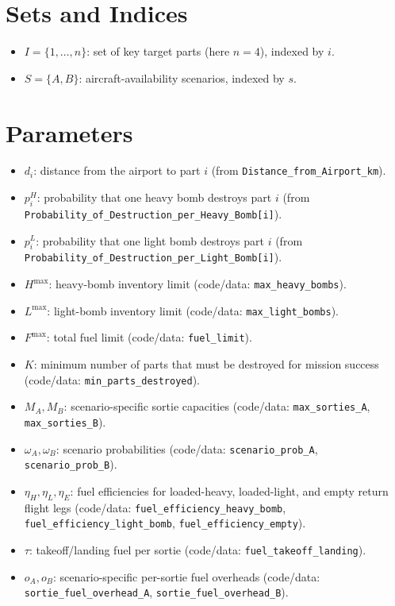\section*{Sets and Indices}

\begin{itemize}
    \item $I=\{1,\dots,n\}$: set of key target parts (here $n=4$), indexed by $i$.
    \item $S=\{A,B\}$: aircraft-availability scenarios, indexed by $s$.
\end{itemize}

\section*{Parameters}

\begin{itemize}
    \item $d_i$: distance from the airport to part $i$ (from \texttt{Distance\_from\_Airport\_km}).
    \item $p_i^H$: probability that one heavy bomb destroys part $i$ (from \texttt{Probability\_of\_Destruction\_per\_Heavy\_Bomb[i]}).
    \item $p_i^L$: probability that one light bomb destroys part $i$ (from \texttt{Probability\_of\_Destruction\_per\_Light\_Bomb[i]}).
    \item $H^{\max}$: heavy-bomb inventory limit (code/data: \texttt{max\_heavy\_bombs}).
    \item $L^{\max}$: light-bomb inventory limit (code/data: \texttt{max\_light\_bombs}).
    \item $F^{\max}$: total fuel limit (code/data: \texttt{fuel\_limit}).
    \item $K$: minimum number of parts that must be destroyed for mission success (code/data: \texttt{min\_parts\_destroyed}).
    \item $M_A, M_B$: scenario-specific sortie capacities (code/data: \texttt{max\_sorties\_A}, \texttt{max\_sorties\_B}).
    \item $\omega_A, \omega_B$: scenario probabilities (code/data: \texttt{scenario\_prob\_A}, \texttt{scenario\_prob\_B}).
    \item $\eta_H,\eta_L,\eta_E$: fuel efficiencies for loaded-heavy, loaded-light, and empty return flight legs (code/data: \texttt{fuel\_efficiency\_heavy\_bomb}, \texttt{fuel\_efficiency\_light\_bomb}, \texttt{fuel\_efficiency\_empty}).
    \item $\tau$: takeoff/landing fuel per sortie (code/data: \texttt{fuel\_takeoff\_landing}).
    \item $o_A,o_B$: scenario-specific per-sortie fuel overheads (code/data: \texttt{sortie\_fuel\_overhead\_A}, \texttt{sortie\_fuel\_overhead\_B}).
\end{itemize}

